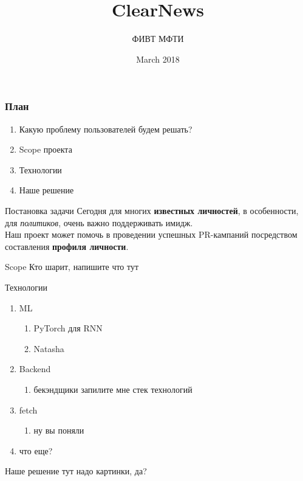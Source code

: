 \documentclass[10pt,pdf,hyperref={unicode}]{beamer}
\title{ClearNews}
\author{ФИВТ МФТИ}
\date{March 2018}
\begin{document}
\maketitle
\begin{frame}\frametitle{План}
\begin{enumerate}
    \item Какую проблему пользователей будем решать?
    \item Scope проекта
    \item Технологии
    \item Наше решение
\end{enumerate}
\end{frame}
\begin{frame}{Постановка задачи}
Сегодня для многих \textbf{известных личностей}, в особенности, для \textit{политиков}, очень важно поддерживать имидж. \\Наш проект может помочь в проведении успешных PR-кампаний посредством составления \textbf{профиля личности}.
\end{frame}

\begin{frame}{Scope}
Кто шарит, напишите что тут
\end{frame}
\begin{frame}{Технологии}
\begin{enumerate}
    \item ML
    \begin{enumerate}
        \item PyTorch для RNN
        \item Natasha
    \end{enumerate}
    \item Backend
        \begin{enumerate}
            \item бекэндщики запилите мне стек технологий
        \end{enumerate}
    \item fetch
        \begin{enumerate}
            \item ну вы поняли
        \end{enumerate}
    \item что еще?
\end{enumerate}
\end{frame}
\begin{frame}{Наше решение}
тут надо картинки, да?
    
\end{frame}
\end{document}
